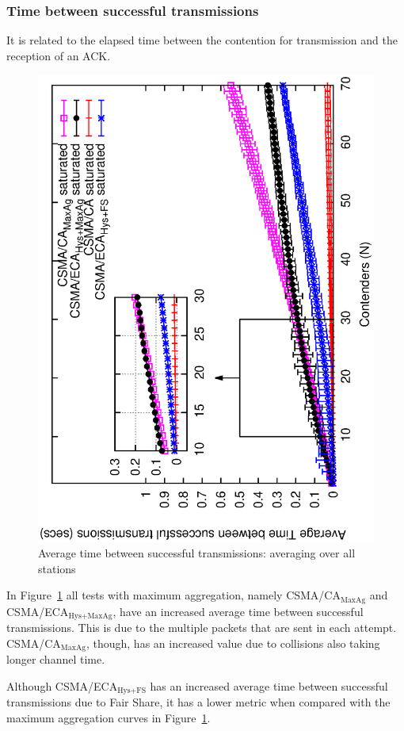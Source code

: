 	\subsubsection{Time between successful transmissions}\label{timeBetweenSxTx}
	It is related to the elapsed time between the contention for transmission and the reception of an ACK.

	\begin{figure}[tb]
		\centering
		\includegraphics[width=0.7\linewidth,angle=-90]{figures/saturated/timeBetweenSxTx-sat/timeBetweenSxTx-multiplot-sat.eps}
		\caption{Average time between successful transmissions: averaging over all stations}
		\label{fig:serviceTime-sat}
	\end{figure}
	
	In Figure~\ref{fig:serviceTime-sat} all tests with maximum aggregation, namely CSMA/CA$_{\text{MaxAg}}$ and CSMA/ECA$_{\text{Hys+MaxAg}}$, have an increased average time between successful transmissions. This is due to the multiple packets that are sent in each attempt. CSMA/CA$_{\text{MaxAg}}$, though, has an increased value due to collisions also taking longer channel time.
	
	Although CSMA/ECA$_{\text{Hys+FS}}$ has an increased average time between successful transmissions due to Fair Share, it has a lower metric when compared with the maximum aggregation curves in Figure~\ref{fig:serviceTime-sat}.



